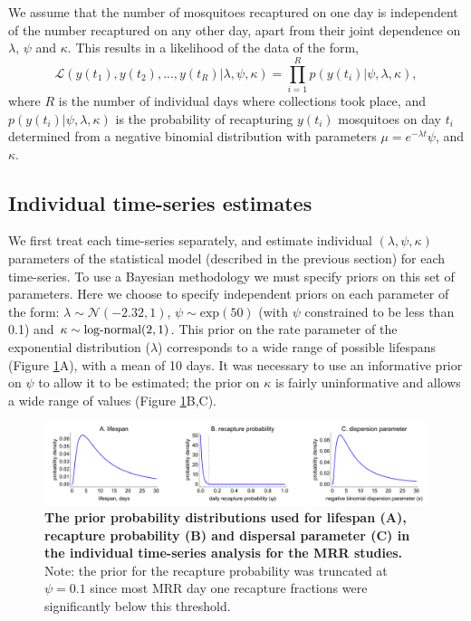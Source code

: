 \documentclass[12pt]{article}
\begin{document}
We assume that the number of mosquitoes recaptured on one day is independent of the number recaptured on any other day, apart from their joint dependence on $\lambda$, $\psi$ and $\kappa$. This results in a likelihood of the data of the form,
%
\begin{equation}
\mathcal{L}(y(t_1),y(t_2),...,y(t_R)|\lambda,\psi,\kappa) = \prod\limits_{i=1}^{R} p(y(t_i)|\psi,\lambda,\kappa),
\end{equation}
%
where $R$ is the number of individual days where collections took place, and $p(y(t_i)|\psi,\lambda,\kappa)$ is the probability of recapturing $y(t_i)$ mosquitoes on day $t_i$ determined from a negative binomial distribution with parameters $\mu = e^{-\lambda t} \psi$, and $\kappa$.

\subsection{Individual time-series estimates}\label{sec:MRR_individual_analysis}
We first treat each time-series separately, and estimate individual $(\lambda,\psi,\kappa)$ parameters of the statistical model (described in the previous section) for each time-series. To use a Bayesian methodology we must specify priors on this set of parameters. Here we choose to specify independent priors on each parameter of the form: $\lambda\sim \mathcal{N}(-2.32,1)$, $\psi\sim \text{exp}(50)$ (with $\psi$ constrained to be less than 0.1) and $\kappa\sim \textnormal{log-normal}(2,1)$. This prior on the rate parameter of the exponential distribution ($\lambda$) corresponds to a wide range of possible lifespans (Figure \ref{fig:mrr_individualTimeSeries_priors}A), with a mean of 10 days. It was necessary to use an informative prior on $\psi$ to allow it to be estimated; the prior on $\kappa$ is fairly uninformative and allows a wide range of values (Figure \ref{fig:mrr_individualTimeSeries_priors}B,C). 


\begin{figure}[h]
	\centerline{\includegraphics[width=1.25\textwidth]{./Figure_files/mrr_individualTimeSeries_priors.pdf}}
	\caption{\textbf{The prior probability distributions used for lifespan (A), recapture probability (B) and dispersal parameter (C) in the individual time-series analysis for the MRR studies.} Note: the prior for the recapture probability was truncated at $\psi=0.1$ since most MRR day one recapture fractions were significantly below this threshold.}
	\label{fig:mrr_individualTimeSeries_priors}
\end{figure}
\end{document}
